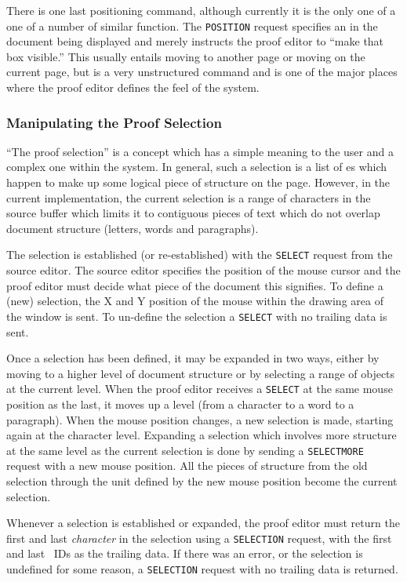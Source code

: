 There is one last positioning command, although currently it is the only
one of a one of a number of similar function.  The {\tt POSITION} request
specifies an {\nbox} in the document being displayed and merely instructs
the proof editor to ``make that box visible.''  This usually entails
moving to another page or moving on the current page, but is a very
unstructured command and is one of the major places where the proof
editor defines the feel of the system.

\subsubsection{Manipulating the Proof Selection}

``The proof selection'' is a concept which has a simple meaning to
the user and a complex one within the system.  In general, such a
selection is a list of \nbox es which happen to make up some logical
piece of structure on the page.  However, in the current implementation,
the current selection is a range of characters in the source buffer
which limits it to contiguous pieces of text which do not overlap
document structure (letters, words and paragraphs).

The selection is established (or re-established) with the {\tt SELECT}
request from the source editor.  The source editor specifies the
position of the mouse cursor and the proof editor must decide what
piece of the document this signifies.  To define a (new) selection,
the X and Y position of the mouse within the drawing area of the
window is sent.  To un-define the selection a {\tt SELECT} with no
trailing data is sent.

Once a selection has been defined, it may be expanded in two ways,
either by moving to a higher level of document structure or by
selecting a range of objects at the current level.  When the proof
editor receives a {\tt SELECT} at the same mouse position as the last,
it moves up a level (from a character to a word to a paragraph).  When
the mouse position changes, a new selection is made, starting again at
the character level.  Expanding a selection which involves more
structure at the same level as the current selection is done by
sending a {\tt SELECTMORE} request with a new mouse position.  All the
pieces of structure from the old selection through the unit defined by
the new mouse position become the current selection.

Whenever a selection is established or expanded, the proof editor must
return the first and last {\it character} in the selection using a
{\tt SELECTION} request, with the first and last \tbox~IDs as the
trailing data.  If there was an error, or the selection is undefined
for some reason, a {\tt SELECTION} request with no trailing data is
returned.

